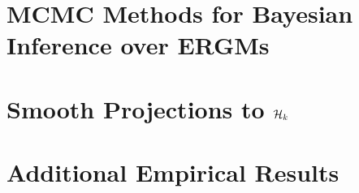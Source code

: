 \documentclass[12pt]{report}
\begin{document}
	\nocite{*}
	\printbibliography	
	
	
		
		\appendix
		
		\chapter{MCMC Methods for Bayesian Inference over ERGMs}\label{appendix_mcmc}
		
		
		
		\chapter{Smooth Projections to $\mathcal{H}_k$}\label{appendix_projections}
		
		
		
		\chapter{Additional Empirical Results}\label{appendix_add_results}
		
		
	
\end{document}
